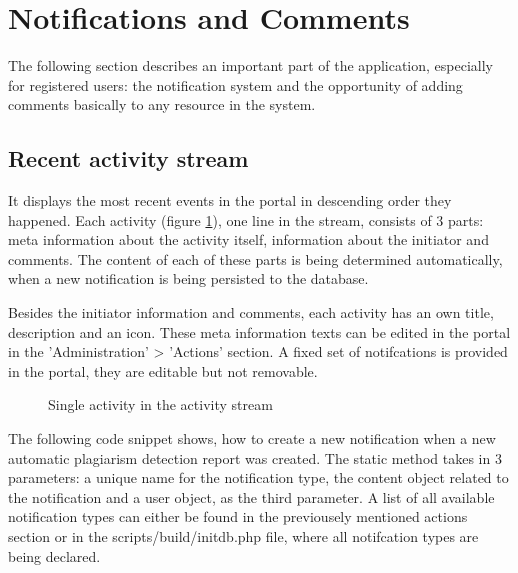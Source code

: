 \section{Notifications and Comments}

The following section describes an important part of the application, especially for registered users: the notification system and the opportunity of adding comments basically to any resource in the system.

\subsection{Recent activity stream}
It displays the most recent events in the portal in descending order they happened. Each activity (figure \ref{fig:activity-stream-single-activity}), one line in the stream, consists of 3 parts: meta information about the activity itself, information about the initiator and comments. The content of each of these parts is being determined automatically, when a new notification is being persisted to the database.

Besides the initiator information and comments, each activity has an own title, description and an icon. These meta information texts can be edited in the portal in the 'Administration' > 'Actions' section. A fixed set of notifcations is provided in the portal, they are editable but not removable.

\begin{figure}[!h]
  \centering
  \caption{Single activity in the activity stream}
  \label{fig:activity-stream-single-activity}
\end{figure}

The following code snippet shows, how to create a new notification when a new automatic plagiarism detection report was created. The static method takes in 3 parameters: a unique name for the notification type, the content object related to the notification and a user object, as the third parameter. A list of all available notification types can either be found in the previousely mentioned actions section or in the scripts/build/initdb.php file, where all notifcation types are being declared.

